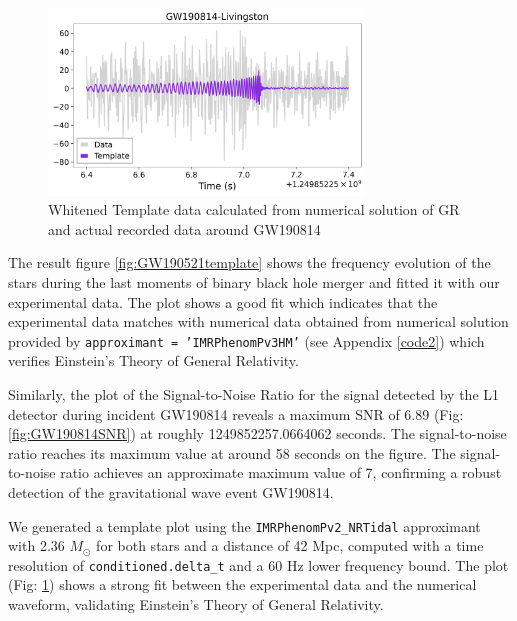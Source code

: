 \begin{figure}[h]
            \centering          
            \includegraphics[width=0.75\textwidth]{GWanalysisProject_codefile/templateplot/templateL1GW190814.png}
            \caption{Whitened Template data calculated from numerical solution of GR and actual recorded data around GW190814}
            \label{fig:GW190814template}
\end{figure}

The result figure \ref{fig:GW190521template} shows the frequency evolution of the stars during the last moments of binary black hole merger and fitted it with our experimental data. The plot shows a good fit which indicates that the experimental data matches with numerical data obtained from numerical solution provided by \texttt{approximant = 'IMRPhenomPv3HM'} (see Appendix \ref{code2}) which verifies Einstein's Theory of General Relativity.


Similarly, the plot of the Signal-to-Noise Ratio for the signal detected by the L1 detector during incident GW190814 reveals a maximum SNR of 6.89 (Fig: \ref{fig:GW190814SNR}) at roughly 1249852257.0664062 seconds. The signal-to-noise ratio reaches its maximum value at around 58 seconds on the figure. The signal-to-noise ratio achieves an approximate maximum value of 7, confirming a robust detection of the gravitational wave event GW190814.

We generated a template plot using the \texttt{IMRPhenomPv2\_NRTidal} approximant with 2.36 $M_\odot$ for both stars and a distance of 42 Mpc, computed with a time resolution of \texttt{conditioned.delta\_t} and a 60 Hz lower frequency bound. The plot (Fig: \ref{fig:GW190814template}) shows a strong fit between the experimental data and the numerical waveform, validating Einstein's Theory of General Relativity.

